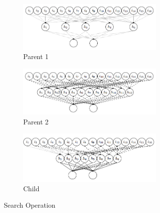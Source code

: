 \begin{figure}[h!]
	\centering
	\begin{subfigure}[b]{1.0\linewidth}
		\centering
		\includegraphics[width=0.8\textwidth]{fig/experiment_architecture_example1.png}
		\caption{Parent 1}
		\label{fig:p1}
	\end{subfigure}
	\newline
	\begin{subfigure}[b]{1.0\linewidth}
		\centering
		\includegraphics[width=0.8\textwidth]{fig/experiment_architecture_example2.png}
		\caption{Parent 2}
		\label{fig:p2}
	\end{subfigure}
	\newline
	\begin{subfigure}[b]{1.0\linewidth}
		\centering
		\includegraphics[width=0.8\textwidth]{fig/experiment_architecture_child.png}
		\caption{Child}
		\label{fig:child}
	\end{subfigure}
	\caption{Search Operation}
	\label{fig:search}
\end{figure}

